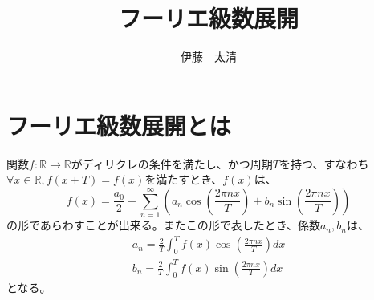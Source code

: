 \documentclass[a4paper]{jsarticle}
\title{フーリエ級数展開}
\author{伊藤　太清}
\begin{document}
\maketitle
\section{フーリエ級数展開とは}
関数$f: \mathbb{R} \longrightarrow \mathbb{R}$がディリクレの条件を満たし、かつ周期$T$を持つ、すなわち$\forall x \in \mathbb{R} , f \left( x + T \right) = f \left( x \right)$を満たすとき、$f \left( x \right)$は、
\begin{equation}
\label{FourierSeriesFomula}
f \left( x \right) = \frac { a_0 } { 2 } + \sum _{ n = 1} ^{ \infty } \left( a_n \cos( \frac { 2 \pi nx } { T } ) + b_n \sin( \frac { 2 \pi nx } { T } ) \right)
\end{equation}
の形であらわすことが出来る。またこの形で表したとき、係数$a_n,b_n$は、
\begin{eqnarray}
a_n = \frac { 2 } { T } \int _0 ^T f \left( x \right) \cos( \frac { 2 \pi nx } { T } ) dx \\
b_n = \frac { 2 } { T } \int _0 ^T f \left( x \right) \sin( \frac { 2 \pi nx } { T } ) dx
\end{eqnarray}
となる。
\end{document}
